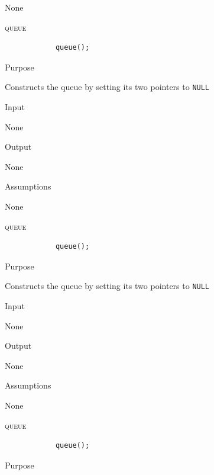 \documentclass[pdftex, 11pt]{article}
\begin{document}
\begin{description}
\begin{description}
				None

		\end{description}
	\item{\textsc{queue}}

		\begin{lstlisting}
			queue();
		\end{lstlisting}

		\begin{description}
			\item{Purpose}
				
				Constructs the queue by setting its two pointers
				to \texttt{NULL}

			\item{Input}

				None

			\item{Output}
				
				None

			\item{Assumptions}

				None

		\end{description}
	\item{\textsc{queue}}

		\begin{lstlisting}
			queue();
		\end{lstlisting}

		\begin{description}
			\item{Purpose}
				
				Constructs the queue by setting its two pointers
				to \texttt{NULL}

			\item{Input}

				None

			\item{Output}
				
				None

			\item{Assumptions}

				None

		\end{description}
	\item{\textsc{queue}}

		\begin{lstlisting}
			queue();
		\end{lstlisting}

		\begin{description}
			\item{Purpose}
				

\end{description}
\end{description}
\end{document}
